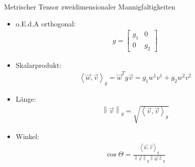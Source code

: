 \documentclass{beamer}
\begin{document}
  \begin{frame}
    \begin{block}{Metrischer Tensor zweidimensionaler Mannigfaltigkeiten}
      \begin{itemize}
        \item o.E.d.A orthogonal:
              \begin{align*}
                g =\begin{bmatrix}
                  g_{1} & 0 \\
                  0 & g_{2}
                \end{bmatrix}
              \end{align*}
        \item Skalarprodukt:
          \begin{align*}
            \left\langle \vec{w}, \vec{v} \right\rangle_{g} = \vec{w}^{T} g \vec{v} = g_{1}w^{1}v^{1} + g_{2}w^{2}v^{2}
          \end{align*}
        \item Länge: 
          \begin{align*}
            \left\| \vec{v} \right\|_{g} = \sqrt{\left\langle \vec{v}, \vec{v} \right\rangle_{g}}
          \end{align*}
        \item Winkel:
          \begin{align*}
            \cos\Theta = \frac{\left\langle \vec{w}, \vec{v} \right\rangle_{g}}{\left\| \vec{v} \right\|_{g} \left\| \vec{w} \right\|_{g}}
          \end{align*}
      \end{itemize}
    \end{block}
  \end{frame}
\end{document}
